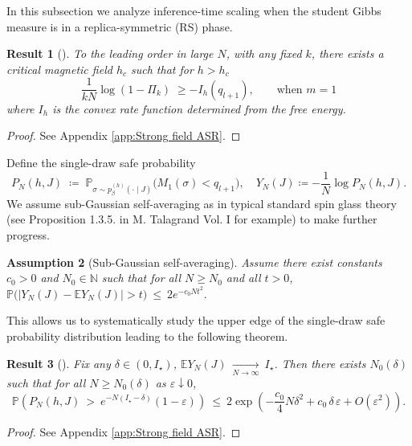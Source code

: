 \documentclass{article}
\newtheorem{theorem}{Result}
\newtheorem{assumption}[theorem]{Assumption}
\theoremstyle{remark} %
\begin{document}
In this subsection we analyze inference-time scaling when the student Gibbs measure is in a replica-symmetric (RS) phase. 
\begin{theorem}[]
\label{thm:high_field}
To the leading order in large $N$, with any fixed $k$, there exists a critical magnetic field $h_c$ such that for $h>h_c$
\begin{equation}
  \frac{1}{kN}\log (1-\Pi_k)
\;\geq- I_h(q_{l+1}) , \qquad \text{when $m=1$}
\label{eq:inftime_gap_rs}
\end{equation}
where $I_h$ is the convex rate function determined from the free energy.
\end{theorem}
\begin{proof}
    See Appendix \ref{app:Strong field ASR}.
\end{proof}
Define the single-draw safe probability
\begin{equation}
P_N(h,J)\;\coloneqq\;\mathbb P_{\sigma\sim p^{(h)}_\beta(\cdot\mid J)}\big(M_1(\sigma)<q_{l+1}\big), \quad  Y_N(J)\coloneqq -\frac1N\log P_N(h,J).    
\end{equation}
We assume sub-Gaussian self-averaging as in typical standard spin glass theory (see Proposition 1.3.5. in M. Talagrand Vol. I for example) to make further progress. 
\begin{assumption}[Sub-Gaussian self-averaging]\label{as:self-avg}
Assume there exist constants $c_0>0$ and $N_0\in\mathbb N$ such that for all $N\ge N_0$ and all $t>0$, $\mathbb P\Big(\big|Y_N(J)-\mathbb E Y_N(J)\big|>t\Big)\ \le\ 2e^{-c_0 N t^2}.$
\end{assumption}
This allows us to systematically study the upper edge of the single-draw safe probability distribution leading to the following theorem.
\begin{theorem}[]\label{thm:hp_upper_P_relaxed}
Fix any $\delta\in(0,I_\star)$, $\mathbb E Y_N(J)\ \xrightarrow[N\to\infty]{}\ I_\star$. Then there exists $N_0(\delta)$ such that for all $N\ge N_0(\delta)$ as $\varepsilon\downarrow 0$,
\begin{equation}\label{eq:hp_upper_P}
\mathbb P\!\left(P_N(h,J)\ >\ e^{-N(I_\star-\delta)}(1-\varepsilon)\right)
\ \le\ 2\exp\!\left(-\frac{c_0}{4}N\delta^2
+c_0\,\delta\,\varepsilon
+O\!\left(\varepsilon^2\right)\right).
\end{equation}
\end{theorem}
\begin{proof}
    See Appendix \ref{app:Strong field ASR}.
\end{proof}
\end{document}
